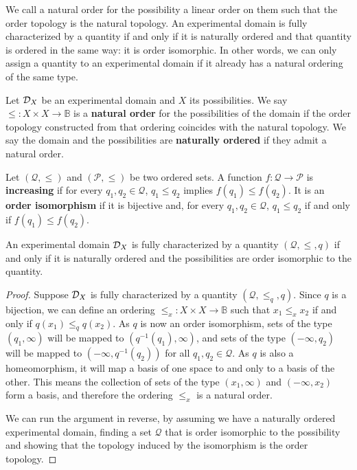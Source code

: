 \documentclass[11pt,letterpaper,fleqn]{memoir} %
\begin{document}
We call a natural order for the possibility a linear order on them such that the order topology is the natural topology. An experimental domain is fully characterized by a quantity if and only if it is naturally ordered and that quantity is ordered in the same way: it is order isomorphic. In other words, we can only assign a quantity to an experimental domain if it already has a natural ordering of the same type.

\begin{mathSection}
\begin{defn}
	Let $\mathcal{D}_X$ be an experimental domain and $X$ its possibilities. We say $\leq : X \times X \to \mathbb{B}$ is a \textbf{natural order} for the possibilities of the domain if the order topology constructed from that ordering coincides with the natural topology. We say the domain and the possibilities are \textbf{naturally ordered} if they admit a natural order.
\end{defn}
\begin{defn}
	Let $(\mathcal{Q}, \leq)$ and $(\mathcal{P}, \leq)$ be two ordered sets. A function $f : \mathcal{Q} \to \mathcal{P}$ is \textbf{increasing} if for every $q_1, q_2 \in \mathcal{Q}$, $q_1 \leq q_2$ implies $f(q_1) \leq f(q_2)$. It is an \textbf{order isomorphism} if it is bijective and, for every $q_1, q_2 \in \mathcal{Q}$, $q_1 \leq q_2$ if and only if $f(q_1) \leq f(q_2)$.
\end{defn}

\begin{thrm}\label{3_thrm_property_ordering}
	An experimental domain $\mathcal{D}_X$ is fully characterized by a quantity $(\mathcal{Q}, \leq, q)$ if and only if it is naturally ordered and the possibilities are order isomorphic to the quantity.
\end{thrm}
\begin{proof}
	Suppose $\mathcal{D}_X$ is fully characterized by a quantity $(\mathcal{Q}, \leq_q, q)$. Since $q$ is a bijection, we can define an ordering $\leq_x : X \times X \to \mathbb{B}$ such that $x_1 \leq_x x_2$ if and only if $q(x_1) \leq_q q(x_2)$. As $q$ is now an order isomorphism, sets of the type $(q_1, \infty)$ will be mapped to $(q^{-1}(q_1), \infty)$, and sets of the type $(-\infty, q_2)$ will be mapped to $(-\infty, q^{-1}(q_2))$ for all $q_1, q_2 \in \mathcal{Q}$. As $q$ is also a homeomorphism, it will map a basis of one space to and only to a basis of the other. This means the collection of sets of the type $(x_1, \infty)$ and $(-\infty, x_2)$ form a basis, and therefore the ordering $\leq_x$ is a natural order.
	
	We can run the argument in reverse, by assuming we have a naturally ordered experimental domain, finding  a set $\mathcal{Q}$ that is order isomorphic to the possibility and showing that the topology induced by the isomorphism is the order topology.
\end{proof}
\end{mathSection}
\end{document}
